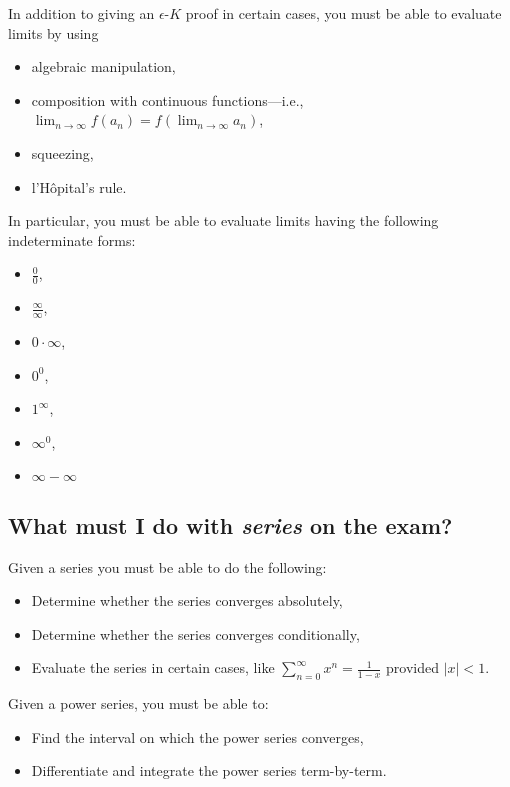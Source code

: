 \documentclass[12pt]{article}
\theoremstyle{definition}
\newcommand{\limn}{\displaystyle\lim_{n \to \infty}}
\begin{document}
In addition to giving an $\epsilon$-$K$ proof in certain cases, you must be able to evaluate limits by using
\begin{multicols}{2}
\begin{itemize}
\item algebraic manipulation,
\item composition with continuous functions---i.e., $\limn f(a_n) = f(\limn a_n)$,
\item squeezing,
\item l'H\^opital's rule.
\end{itemize}
\end{multicols}
\noindent
In particular, you must be able to evaluate limits having the following indeterminate forms:
\begin{multicols}{7}
\small
\begin{itemize}
\item $\displaystyle\frac{0}{0}$,
\item $\displaystyle\frac{\infty}{\infty}$,
\item $0 \cdot \infty$,
\item $0^0$,
\item $1^\infty$,
\item $\infty^0$,
\item $\infty - \infty$
\end{itemize}
\end{multicols}

\subsection*{What must I do with \textit{series} on the exam?}

Given a series you must be able to do the following:
\begin{itemize}
\item Determine whether the series converges absolutely,
\item Determine whether the series converges conditionally,
\item Evaluate the series in certain cases, like $\displaystyle\sum_{n=0}^\infty x^n = \frac{1}{1-x}$ provided $|x| < 1$.
\end{itemize}
\noindent
Given a power series, you must be able to:
\begin{itemize}
\item Find the interval on which the power series converges,
\item Differentiate and integrate the power series term-by-term.
\end{itemize}
\end{document}
